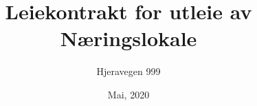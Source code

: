 \documentclass[a4paper, oneside, onecolumn, 11pt, notitlepage, reqno]{article}
\title{Leiekontrakt for utleie av Næringslokale}
\author{Hjeravegen 999}
\date{Mai, 2020}
\begin{document}
	\begin{titlingpage}
		\maketitle
	\end{titlingpage}


	
	
	
	
	
	
	
	
	
	
	
	
	
	
	
	
	
	
	
	
	
	
	
    
	
	
    
\end{document}
